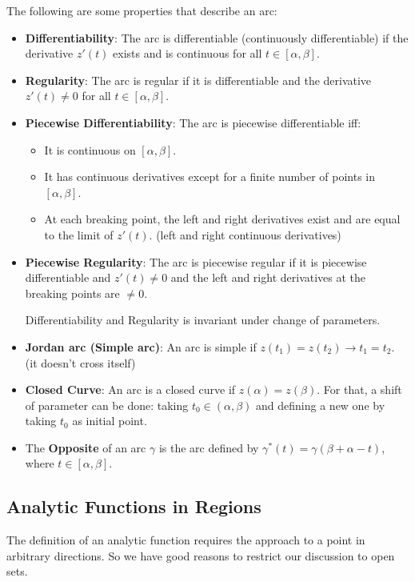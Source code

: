 \documentclass[../main.tex]{subfiles}
\begin{document}
The following are some properties that describe an arc:
\begin{itemize}
	\item \textbf{Differentiability}: The arc is differentiable (continuously differentiable) if the derivative $z'(t)$ exists and is continuous for all $t\in[\alpha,\beta]$.
	\item \textbf{Regularity}: The arc is regular if it is differentiable and the derivative $z'(t) \neq 0$ for all $t\in[\alpha,\beta]$.
	\item \textbf{Piecewise Differentiability}: The arc is piecewise differentiable iff:
		\begin{itemize}
		\item It is continuous on $[\alpha,\beta]$.
		\item It has continuous derivatives except for a finite number of points in $[\alpha,\beta]$.
		\item At each breaking point, the left and right derivatives exist and are equal to the limit of $z'(t)$. (left and right continuous derivatives)
		\end{itemize}
	\item \textbf{Piecewise Regularity}: The arc is piecewise regular if it is piecewise differentiable and $z'(t) \neq 0$ and the left and right derivatives at the breaking points are $\neq 0$.
		\begin{remark}
		Differentiability and Regularity is invariant under change of parameters.
		\end{remark}
	\item \textbf{Jordan arc (Simple arc)}: An arc is simple if $z(t_1)=z(t_2) \rightarrow t_1=t_2$. (it doesn't cross itself)
	\item \textbf{Closed Curve}: An arc is a closed curve if $z(\alpha)=z(\beta)$. For that, a shift of parameter can be done: taking $t_0\in (\alpha,\beta)$ and defining a new one by taking $t_0$ as initial point.
	\item The \textbf{Opposite} of an arc $\gamma$ is the arc defined by $\gamma^*(t) = \gamma(\beta + \alpha - t)$, where $t\in[\alpha,\beta]$.
\end{itemize}

\subsection{Analytic Functions in Regions}
The definition of an analytic function requires the approach to a point in arbitrary directions. So we have good reasons to restrict our discussion to open sets.
\end{document}
